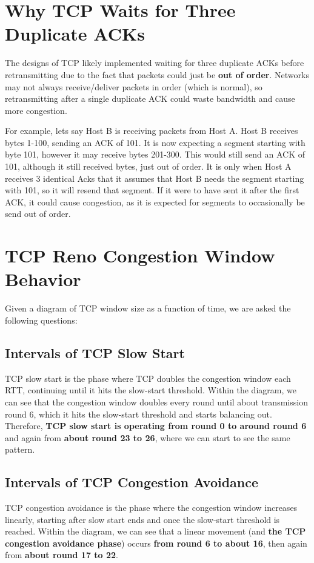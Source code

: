 \documentclass[colorlinks=true, allcolors=blue]{article}
\begin{document}
\setcounter{section}{35}
\section{Why TCP Waits for Three Duplicate ACKs}
The designs of TCP likely implemented waiting for three duplicate ACKs before retransmitting due to the fact that packets could just be \textbf{out of order}. Networks may not always receive/deliver packets in order (which is normal), so retransmitting after a single duplicate ACK could waste bandwidth and cause more congestion. 

For example, lets say Host B is receiving packets from Host A. Host B receives bytes 1-100, sending an ACK of 101. It is now expecting a segment starting with byte 101, however it may receive bytes 201-300. This would still send an ACK of 101, although it still received bytes, just out of order. It is only when Host A receives 3 identical Acks that it assumes that Host B needs the segment starting with 101, so it will resend that segment. If it were to have sent it after the first ACK, it could cause congestion, as it is expected for segments to occasionally be send out of order.

\setcounter{section}{39}
\section{TCP Reno Congestion Window Behavior}
Given a diagram of TCP window size as a function of time, we are asked the following questions:

\subsection{Intervals of TCP Slow Start}
TCP slow start is the phase where TCP doubles the congestion window each RTT, continuing until it hits the slow-start threshold. Within the diagram, we can see that the congestion window doubles every round until about transmission round 6, which it hits the slow-start threshold and starts balancing out. Therefore, \textbf{TCP slow start is operating from round 0 to around round 6} and again from \textbf{about round 23 to 26}, where we can start to see the same pattern.

\subsection{Intervals of TCP Congestion Avoidance}
TCP congestion avoidance is the phase where the congestion window increases linearly, starting after slow start ends and once the slow-start threshold is reached.  Within the diagram, we can see that a linear movement (and \textbf{the TCP congestion avoidance phase}) occurs \textbf{from round 6 to about 16}, then again from \textbf{about round 17 to 22}.
\end{document}
